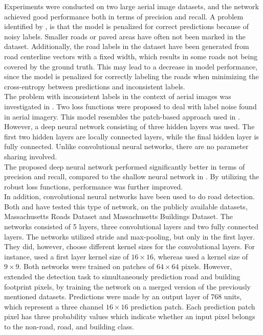Experiments were conducted on two large aerial image datasets, and the network achieved good performance both in terms of precision and recall. A problem identified by \cite{Mnih_roads_high_res_aerial_images}, is that the model is penalized for correct predictions because of noisy labels. Smaller roads or paved areas have often not been marked in the dataset. Additionally, the road labels in the dataset have been generated from road centerline vectors with a fixed width, which results in some roads not being covered by the ground truth. This may lead to a decrease in model performance, since the model is penalized for correctly labeling the roads when minimizing the cross-entropy between predictions and inconsistent labels.\\

The problem with inconsistent labels in the context of aerial images was investigated in \citep{Mnih_aerial_images_noisy}. Two loss functions were proposed to deal with label noise found in aerial imagery. This model resembles the patch-based approach used in \cite{Mnih_roads_high_res_aerial_images}. However, a deep neural network consisting of three hidden layers was used. The first two hidden layers are locally connected layers, while the final hidden layer is fully connected. Unlike convolutional neural networks, there are no parameter sharing involved. \\

The proposed deep neural network performed significantly better in terms of precision and recall, compared to the shallow neural network in \citep{Mnih_roads_high_res_aerial_images}. By utilizing the robust loss functions, performance was further improved.\\

In addition, convolutional neural networks have been used to do road detection. Both \cite{MnihThesis} and \cite{saito_building_and_roads} have tested this type of network, on the publicly available datasets, Massachusetts Roads Dataset and Massachusetts Buildings Dataset. The networks consisted of 5 layers, three convolutional layers and two fully connected layers. The networks utilized stride and max-pooling, but only in the first layer. They did, however, choose different kernel sizes for the convolutional layers. For instance, \cite{MnihThesis} used a first layer kernel size of $16 \times 16$, whereas \cite{saito_building_and_roads} used a kernel size of $9 \times9$.  Both networks were trained on patches of $64 \times 64$ pixels. However, \cite{saito_building_and_roads} extended the detection task to simultaneously prediction road and building footprint pixels, by training the network on a merged version of the previously mentioned datasets. Predictions were made by an output layer of 768 units, which represent a three channel $16 \times 16$ prediction patch. Each prediction patch pixel has three probability values which indicate whether an input pixel belongs to the non-road, road, and building class.\\

